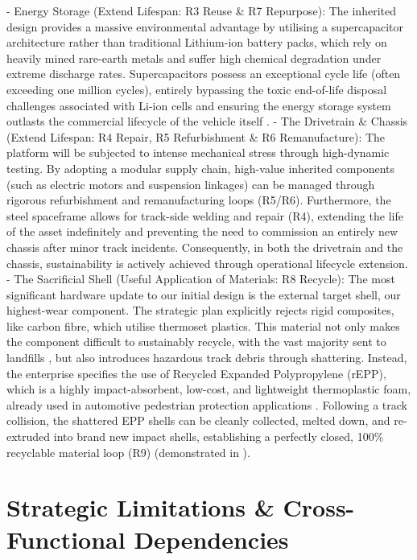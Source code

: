 - Energy Storage (Extend Lifespan: R3 Reuse \& R7 Repurpose): The inherited design provides a massive environmental advantage by utilising a supercapacitor architecture rather than traditional Lithium-ion battery packs, which rely on heavily mined rare-earth metals and suffer high chemical degradation under extreme discharge rates. Supercapacitors possess an exceptional cycle life (often exceeding one million cycles), entirely bypassing the toxic end-of-life disposal challenges associated with Li-ion cells and ensuring the energy storage system outlasts the commercial lifecycle of the vehicle itself %
.
- The Drivetrain \& Chassis (Extend Lifespan: R4 Repair, R5 Refurbishment \& R6 Remanufacture): The platform will be subjected to intense mechanical stress through high-dynamic testing. By adopting a modular supply chain, high-value inherited components (such as electric motors and suspension linkages) can be managed through rigorous refurbishment and remanufacturing loops (R5/R6). Furthermore, the steel spaceframe allows for track-side welding and repair (R4), extending the life of the asset indefinitely and preventing the need to commission an entirely new chassis after minor track incidents. Consequently, in both the drivetrain and the chassis, sustainability is actively achieved through operational lifecycle extension.
- The Sacrificial Shell (Useful Application of Materials: R8 Recycle): The most significant hardware update to our initial design is the external target shell, our highest-wear component. The strategic plan explicitly rejects rigid composites, like carbon fibre, which utilise thermoset plastics. This material not only makes the component difficult to sustainably recycle, with the vast majority sent to landfills \cite[p.~2]{morici_2022}, but also introduces hazardous track debris through shattering. Instead, the enterprise specifies the use of Recycled Expanded Polypropylene (rEPP), which is a highly impact-absorbent, low-cost, and lightweight thermoplastic foam, already used in automotive pedestrian protection applications \cite[p.~1]{ramaswamy_2017}. Following a track collision, the shattered EPP shells can be cleanly collected, melted down, and re-extruded into brand new impact shells, establishing a perfectly closed, 100\% recyclable material loop (R9) (demonstrated in \cite{handtke_2024}).

\section{Strategic Limitations \& Cross-Functional Dependencies}

